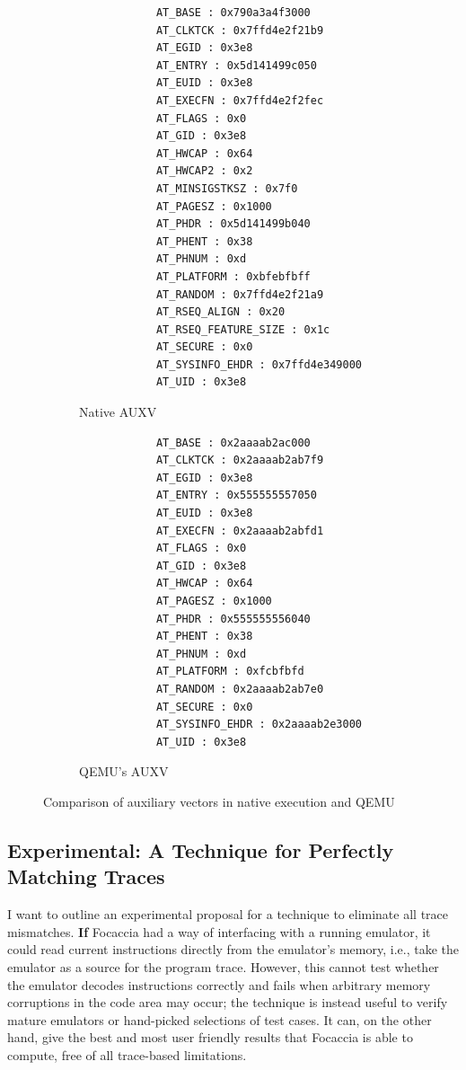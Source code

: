 \begin{figure}[htpb]
    \begin{subfigure}[t]{0.4\linewidth}
        \begin{lstlisting}
            AT_BASE : 0x790a3a4f3000
            AT_CLKTCK : 0x7ffd4e2f21b9
            AT_EGID : 0x3e8
            AT_ENTRY : 0x5d141499c050
            AT_EUID : 0x3e8
            AT_EXECFN : 0x7ffd4e2f2fec
            AT_FLAGS : 0x0
            AT_GID : 0x3e8
            AT_HWCAP : 0x64
            AT_HWCAP2 : 0x2
            AT_MINSIGSTKSZ : 0x7f0
            AT_PAGESZ : 0x1000
            AT_PHDR : 0x5d141499b040
            AT_PHENT : 0x38
            AT_PHNUM : 0xd
            AT_PLATFORM : 0xbfebfbff
            AT_RANDOM : 0x7ffd4e2f21a9
            AT_RSEQ_ALIGN : 0x20
            AT_RSEQ_FEATURE_SIZE : 0x1c
            AT_SECURE : 0x0
            AT_SYSINFO_EHDR : 0x7ffd4e349000
            AT_UID : 0x3e8
        \end{lstlisting}
    \caption{Native AUXV}
    \label{fig:native_auxv}
    \end{subfigure}
    \hfill
    \begin{subfigure}[t]{0.4\linewidth}
        \begin{lstlisting}
            AT_BASE : 0x2aaaab2ac000
            AT_CLKTCK : 0x2aaaab2ab7f9
            AT_EGID : 0x3e8
            AT_ENTRY : 0x555555557050
            AT_EUID : 0x3e8
            AT_EXECFN : 0x2aaaab2abfd1
            AT_FLAGS : 0x0
            AT_GID : 0x3e8
            AT_HWCAP : 0x64
            AT_PAGESZ : 0x1000
            AT_PHDR : 0x555555556040
            AT_PHENT : 0x38
            AT_PHNUM : 0xd
            AT_PLATFORM : 0xfcbfbfd
            AT_RANDOM : 0x2aaaab2ab7e0
            AT_SECURE : 0x0
            AT_SYSINFO_EHDR : 0x2aaaab2e3000
            AT_UID : 0x3e8
        \end{lstlisting}
        \caption{QEMU's AUXV}
        \label{fig:qemu_auxv}
    \end{subfigure}
    \caption{Comparison of auxiliary vectors in native execution and QEMU}
    \label{fig:auxv_comparison}
\end{figure}

\subsection{Experimental: A Technique for Perfectly Matching Traces}\label{sec:experimental_trace_match}

I want to outline an experimental proposal for a technique to eliminate all trace mismatches. \textbf{If} Focaccia had a
way of interfacing with a running emulator, it could read current instructions directly from the emulator's memory,
i.e., take the emulator as a source for the program trace. However, this cannot test whether the emulator decodes
instructions correctly and fails when arbitrary memory corruptions in the code area may occur; the technique is instead
useful to verify mature emulators or hand-picked selections of test cases. It can, on the other hand, give the best and
most user friendly results that Focaccia is able to compute, free of all trace-based limitations.

